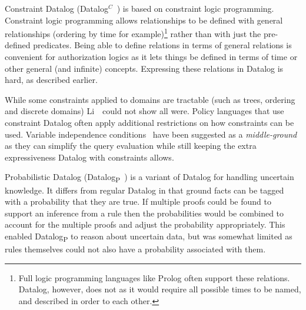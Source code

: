 \documentclass[thesis.tex]{subfiles}
\begin{document}
Constraint Datalog (Datalog$^C$~\cite{li_datalog_2003}) is based
on constraint logic programming.  Constraint logic programming allows
relationships to be defined with general relationships (ordering by time
for example)\footnote{Full logic programming languages like Prolog often
support these relations. Datalog, however, does not as it would require all
possible times to be named, and described in order to each other.} rather than with just the pre-defined predicates.  Being able to
define relations in terms of general relations is convenient for
authorization logics as it lets things be defined in terms of time or
other general (and infinite) concepts. 
Expressing these relations in Datalog is hard, as described earlier.

While some constraints applied to domains are tractable (such as
trees, ordering and discrete domains) Li~\etal{}~could not show
all were.  Policy languages that use constraint Datalog often apply
additional restrictions on how constraints can be used.  Variable independence
conditions~\cite{chomicki_variable_2003} have been suggested as a \emph{middle-ground}
as they can simplify the query evaluation while still keeping the extra
expressiveness Datalog with constraints allows.

Probabilistic Datalog
(Datalog\textsubscript{P}~\cite{fuhr_probabilistic_1995}) is a variant
of Datalog for handling uncertain knowledge.  It differs from regular
Datalog in that ground facts can be tagged with a probability that
they are true.  If multiple proofs could be found to support an
inference from a rule then the probabilities would be combined to
account for the multiple proofs and adjust the probability
appropriately. This enabled Datalog\textsubscript{P} to reason about
uncertain data, but was somewhat limited as rules themselves could not
also have a probability associated with them.
\end{document}
